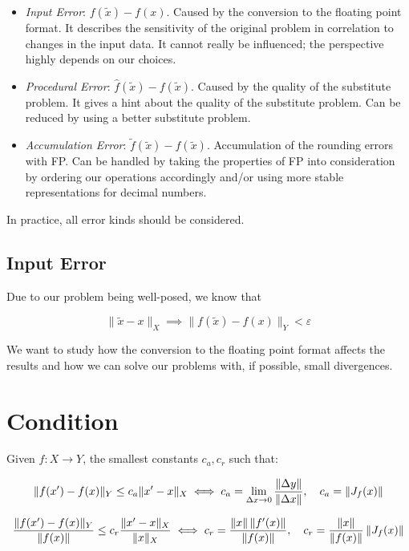 \begin{itemize}

    \item \emph{Input Error}: \(f(\tilde{x}) - f(x)\). Caused by the conversion to the floating point format. It describes 
    the sensitivity of the original problem in correlation to changes in the input data. It cannot really be influenced; the perspective highly depends on our choices.

    \item \emph{Procedural Error}: \(\hat{f}(\tilde{x}) - f(\tilde{x})\). Caused by the quality of the substitute problem.
    It gives a hint about the quality of the substitute problem. Can be reduced by using a better substitute problem.

    \item \emph{Accumulation Error}: \(\tilde{f}(\tilde{x})- \hat{f}(\tilde{x})\). Accumulation of the rounding errors with FP. Can be handled by 
    taking the properties of FP into consideration by ordering our operations accordingly and/or using more stable representations for decimal numbers.

\end{itemize}

In practice, all error kinds should be considered.

\subsection{Input Error}

Due to our problem being well-posed, we know that 

\[
    \| \tilde{x} - x \|_X \implies \|f(\tilde{x}) - f(x)\|_Y < \varepsilon 
\]

We want to study how the conversion to the floating point format affects the results and how 
we can solve our problems with, if possible, small divergences. 

\section{Condition}

Given \(f: X \to Y\), the smallest constants \(c_a, c_r\) such that: 

\[
    \|f(x') - f(x) \|_Y \le c_a \|x' - x\|_X \iff c_a = \lim_{\Delta x \to 0} \frac{\left\| \Delta y \right\|}{\left\| \Delta x \right\|}, \quad c_a = \left\| J_f(x) \right\|
\]

\[
    \frac{\|f(x') - f(x) \|_Y}{\|f(x)\|} \le c_r \frac{\|x' - x\|_X}{\|x\|_X} \iff c_r = \frac{\left\| x \right\|\left\| f'(x) \right\|}{\left\| f(x) \right\|}, \quad c_r = \frac{\left\| x \right\|}{\left\| f(x) \right\|} \left\| J_f (x) \right\|
\]

